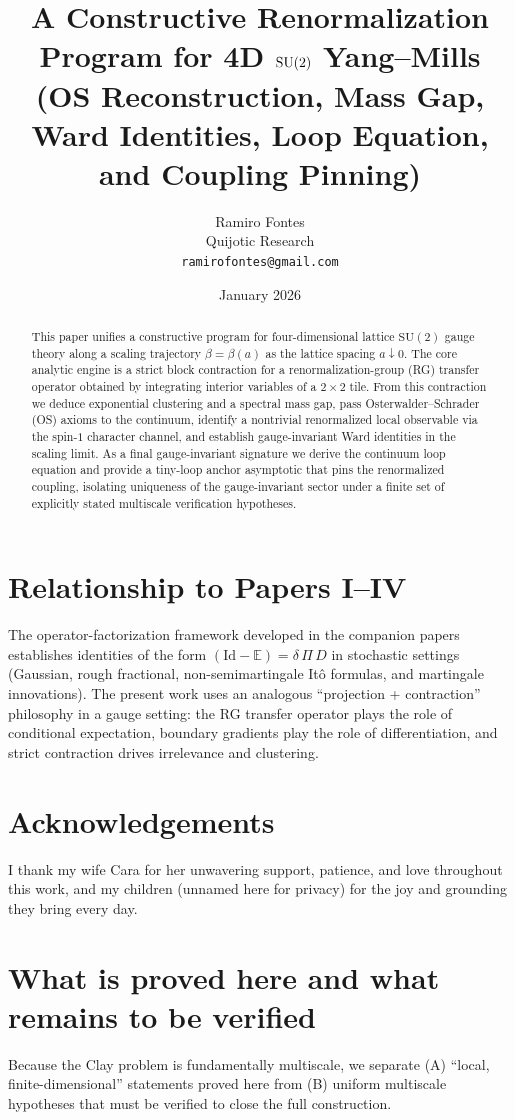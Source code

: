 \documentclass[11pt]{article}
\title{A Constructive Renormalization Program for 4D $\SU(2)$ Yang--Mills\\
(OS Reconstruction, Mass Gap, Ward Identities, Loop Equation, and Coupling Pinning)}
\author{Ramiro Fontes\\Quijotic Research\\\texttt{ramirofontes@gmail.com}}
\date{January 2026}
\theoremstyle{definition}
\newcommand{\E}{\mathbb{E}}
\newcommand{\SU}{\mathrm{SU}}
\newcommand{\1}{\mathbf{1}}
\begin{document}
\maketitle

\begin{abstract}
This paper unifies a constructive program for four-dimensional lattice $\SU(2)$ gauge theory along a scaling trajectory $\beta=\beta(a)$ as the lattice spacing $a\downarrow 0$. The core analytic engine is a strict block contraction for a renormalization-group (RG) transfer operator obtained by integrating interior variables of a $2\times2$ tile. From this contraction we deduce exponential clustering and a spectral mass gap, pass Osterwalder--Schrader (OS) axioms to the continuum, identify a nontrivial renormalized local observable via the spin-$1$ character channel, and establish gauge-invariant Ward identities in the scaling limit. As a final gauge-invariant signature we derive the continuum loop equation and provide a tiny-loop anchor asymptotic that pins the renormalized coupling, isolating uniqueness of the gauge-invariant sector under a finite set of explicitly stated multiscale verification hypotheses.
\end{abstract}

\section{Relationship to Papers I--IV}
The operator-factorization framework developed in the companion papers~\cite{Fontes2026I,Fontes2026II,Fontes2026III,Fontes2026IV} establishes identities of the form $(\mathrm{Id}-\E)=\delta\,\Pi\,D$ in stochastic settings (Gaussian, rough fractional, non-semimartingale It\^o formulas, and martingale innovations). The present work uses an analogous “projection + contraction” philosophy in a gauge setting: the RG transfer operator plays the role of conditional expectation, boundary gradients play the role of differentiation, and strict contraction drives irrelevance and clustering.

\section{Acknowledgements}
I thank my wife Cara for her unwavering support, patience, and love throughout this work, and my children (unnamed here for privacy) for the joy and grounding they bring every day.

\tableofcontents
\newpage

\section{What is proved here and what remains to be verified}
Because the Clay problem is fundamentally multiscale, we separate (A) “local, finite-dimensional” statements proved here from (B) uniform multiscale hypotheses that must be verified to close the full construction.
\end{document}
